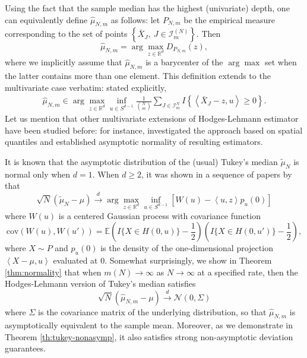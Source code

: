 \documentclass[12pt]{article}
\newcommand\cov{\mathrm{cov}}
\newcommand{\wh}{\widehat}
\newcommand{\wt}{\widetilde}
\def\l{\left}
\def\r{\right}
\newcommand{\m}{\mathcal}
\newcommand{\mb}{\mathbb}
\newcommand{\dotp}[2]{\left\langle#1,#2\right\rangle}
\theoremstyle{thmstyletwo}%
\theoremstyle{thmstylethree}%
\begin{document}
Using the fact that the sample median has the highest (univariate) depth, one can equivalently define $\wh\mu_{N,m}$ as follows: let $P_{N,m}$ be the empirical measure corresponding to the set of points $\l\{ \bar X_J, \ J\in \m I_{m}^{(N)}\r\}$. Then 
\[
\wh\mu_{N,m} = \arg\max_{z\in \mb R^d} D_{P_{N,m}}(z),
\]
where we implicitly assume that $\wh\mu_{N,m}$ is a barycenter of the $\arg\max$ set when the latter contains more than one element. This definition extends to the multivariate case verbatim: stated explicitly, 
\begin{align}
\label{eq:tukey}
    \wh\mu_{N,m} \in \arg\max_{z\in \mb R^d}\inf_{u\in S^{d-1}} \frac{1}{{N \choose m}} \sum_{J \in \mathcal{I}^N_m} I\left\{ \dotp{\bar X_J-z}{u}\geq 0\right\}.
\end{align}
Let us mention that other multivariate extensions of Hodges-Lehmann estimator have been studied before: for instance, \cite{chaudhuri1992multivariate} investigated the approach based on spatial quantiles and established asymptotic normality of resulting estimators. 

It is known that the asymptotic distribution of the (usual) Tukey's median $\wt\mu_{N}$ is normal only when $d=1$. When $d\geq2$, it was shown in a sequence of papers by \cite{nolan1999min, bai1999asymptotic, masse2002asymptotics} that  
\begin{equation}
\label{eq:asymp-tukey}
 \sqrt{N}\l( \wt\mu_{N} - \mu \r) \xrightarrow[]{d}  \arg\max_{z\in \mb R^d} \inf_{u\in S^{d-1}} \l[W(u) - \dotp{u}{z} p_u(0)\r]
\end{equation}
where $W(u)$ is a centered Gaussian process with covariance function  
\[
\cov(W(u), W(u')) = \mb E\l(I\{X\in H(0,u)\}-\frac12\r)\l(I\{X\in H(0,u')\}-\frac12\r),
\]
where $X\sim P$ and $p_u(0)$ is the density of the one-dimensional projection $\dotp{X-\mu}{u}$ evaluated at $0$. Somewhat surprisingly, we show in Theorem \ref{thm:normality} that when $m(N)\to\infty$ as $N\to\infty$ at a specified rate, then the Hodges-Lehmann version of Tukey's median satisfies 
\[
\sqrt{N}\l( \wh\mu_{N,m} - \mu \r) \xrightarrow[]{d} \m N(0,\Sigma)
\]
where $\Sigma$ is the covariance matrix of the underlying distribution, so that $\wh\mu_{N,m}$ is asymptotically equivalent to the sample mean. Moreover, as we demonstrate in Theorem \ref{th:tukey-nonasymp}, it also satisfies strong non-asymptotic deviation guarantees. 
\end{document}
